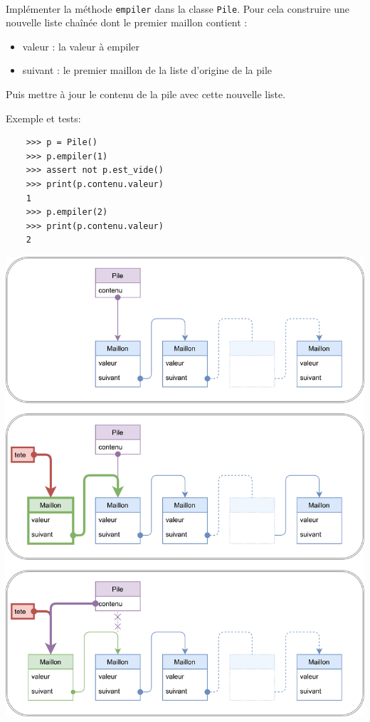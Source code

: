 \documentclass[a4paper,17pt]{extarticle}
\let\origfigure\figure
\let\endorigfigure\endfigure
\renewenvironment{figure}[1][2] {
    \expandafter\origfigure\expandafter[H]
} {
    \endorigfigure
}
\newenvironment{eleve}%
{\begin{activite}\color{noiramu}\\[-0.5cm]}
{\end{activite}}
\providecommand{\tightlist}{%
      \setlength{\itemsep}{0pt}\setlength{\parskip}{0pt}}
\begin{document}
\begin{eleve}
    Implémenter la méthode \texttt{empiler} dans la classe \texttt{Pile}.
Pour cela construire une nouvelle liste chaînée dont le premier maillon
contient :

\begin{itemize}
\tightlist
\item
  valeur : la valeur à empiler
\item
  suivant : le premier maillon de la liste d'origine de la pile
\end{itemize}

Puis mettre à jour le contenu de la pile avec cette nouvelle liste.

Exemple et tests:

\begin{verbatim}
    >>> p = Pile()
    >>> p.empiler(1)
    >>> assert not p.est_vide()
    >>> print(p.contenu.valeur)
    1
    >>> p.empiler(2)
    >>> print(p.contenu.valeur)
    2
\end{verbatim}
        
        \end{eleve}
    \begin{figure}
\centering
\includegraphics{img-empiler.png}
\caption{Empiler un maillon}
\end{figure}
\end{document}
